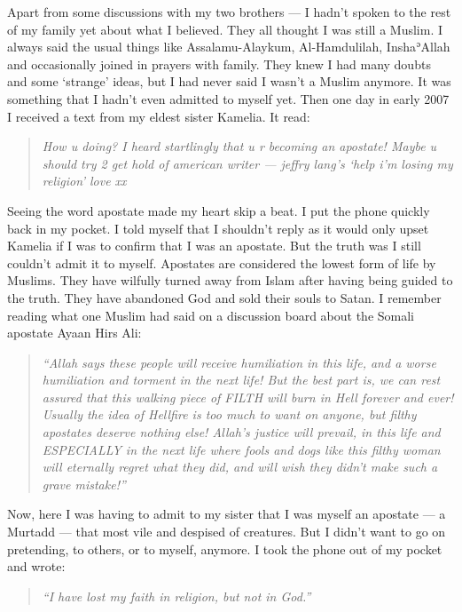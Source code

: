 \documentclass[12pt]{memoir}
\def\´{ʾ} %
\begin{document}
Apart from some discussions with my two brothers —
I hadn’t spoken to the rest of my family yet about what I believed.
They all thought I was still a Muslim.
I always said the usual things like Assalamu-Alaykum, Al-Hamdulilah,
Insha\´Allah and occasionally joined in prayers with family.
They knew I had many doubts and some ‘strange’ ideas,
but I had never said I wasn’t a Muslim anymore.
It was something that I hadn’t even admitted to myself yet.
Then one day in early 2007 I received a text from my eldest sister Kamelia.
It read:

\begin{quote}
\itshape
How u doing?
I heard startlingly that u r becoming an apostate!
Maybe u should try 2 get hold of american writer —
jeffry lang’s ‘help i’m losing my religion’ love xx
\end{quote}

Seeing the word apostate made my heart skip a beat.
I put the phone quickly back in my pocket.
I told myself that I shouldn’t reply as it would only upset Kamelia
if I was to confirm that I was an apostate.
But the truth was I still couldn’t admit it to myself.
Apostates are considered the lowest form of life by Muslims.
They have wilfully turned away from Islam
after having being guided to the truth.
They have abandoned God and sold their souls to Satan.
I remember reading what one Muslim had said on a discussion board
about the Somali apostate Ayaan Hirs Ali:

\begin{quote}
\itshape
“Allah says these people will receive humiliation in this life,
and a worse humiliation and torment in the next life!
But the best part is, we can rest assured
that this walking piece of FILTH will burn in Hell forever and ever!
Usually the idea of Hellfire is too much to want on anyone,
but filthy apostates deserve nothing else! Allah’s justice will prevail,
in this life and ESPECIALLY in the next life where fools and dogs
like this filthy woman will eternally regret what they did,
and will wish they didn’t make such a grave mistake!”
\end{quote}

Now, here I was having to admit to my sister that I was myself an apostate —
a Murtadd — that most vile and despised of creatures.
But I didn’t want to go on pretending, to others, or to myself, anymore.
I took the phone out of my pocket and wrote:

\begin{quote}
\emph{“I have lost my faith in religion, but not in God.”}
\end{quote}
\end{document}
